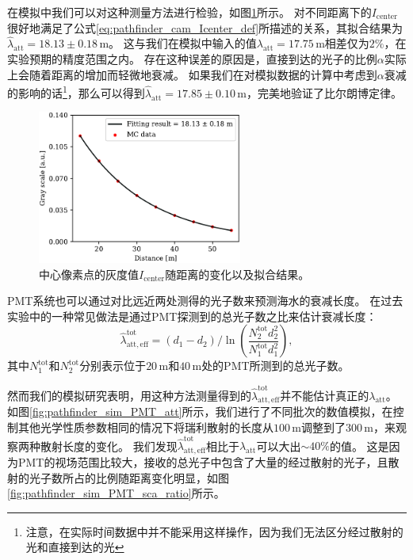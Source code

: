 在模拟中我们可以对这种测量方法进行检验，如图\ref{fig:pathfinder_sim_cam_Icenter_fit}所示。
对不同距离下的$I_{\mathrm{center}}$很好地满足了公式\ref{eq:pathfinder_cam_Icenter_def}所描述的关系，其拟合结果为$\hat{\lambda}_\mathrm{att} = 18.13 \pm 0.18 \,\mathrm{m}$。
这与我们在模拟中输入的值$\lambda_\mathrm{att} = 17.75 \,\mathrm{m}$相差仅为$2\%$，在实验预期的精度范围之内。
存在这种误差的原因是，直接到达的光子的比例$\alpha$实际上会随着距离的增加而轻微地衰减。
如果我们在对模拟数据的计算中考虑到$\alpha$衰减的影响的话\footnote{注意，在实际时间数据中并不能采用这样操作，因为我们无法区分经过散射的光和直接到达的光}，那么可以得到$\hat{\lambda}_\mathrm{att} = 17.85 \pm 0.10 \,\mathrm{m}$，完美地验证了比尔朗博定律。

\begin{figure}[htp]
    \centering
    \includegraphics[width=0.6\textwidth]{img/pathfinder_sim_cam_Icenter_fit.pdf}
    \caption{中心像素点的灰度值$I_{\mathrm{center}}$随距离的变化以及拟合结果。}
    \label{fig:pathfinder_sim_cam_Icenter_fit}
\end{figure}

PMT系统也可以通过对比远近两处测得的光子数来预测海水的衰减长度。
在过去实验\cite{OP_ANTARES:2004, OP_P-One:2021}中的一种常见做法是通过PMT探测到的总光子数之比来估计衰减长度：
\begin{equation}
    \hat{\lambda}_\mathrm{att,eff}^\mathrm{tot} = (d_1 - d_2) / \ln \left( \frac{N_\mathrm{2}^\mathrm{tot} d_2^2}{N_\mathrm{1}^\mathrm{tot} d_1^2} \right) ,
    \label{eq:pathfinder_PMT_att_eff}
\end{equation}
其中$N_1^\mathrm{tot}$和$N_2^\mathrm{tot}$分别表示位于$20\,\mathrm{m}$和$40\,\mathrm{m}$处的PMT所测到的总光子数。

然而我们的模拟研究表明，用这种方法测量得到的$\hat{\lambda} _\mathrm{att,eff} ^\mathrm{tot}$并不能估计真正的$\lambda _\mathrm{att}$。
如图\ref{fig:pathfinder_sim_PMT_att}所示，我们进行了不同批次的数值模拟，在控制其他光学性质参数相同的情况下将瑞利散射的长度从$100\,\mathrm{m}$调整到了$300\,\mathrm{m}$，来观察两种散射长度的变化。
我们发现$\hat{\lambda} _\mathrm{att,eff} ^\mathrm{tot}$相比于$\lambda _\mathrm{att}$可以大出$\sim 40\%$的值。
这是因为PMT的视场范围比较大，接收的总光子中包含了大量的经过散射的光子，且散射的光子数所占的比例随距离变化明显，如图\ref{fig:pathfinder_sim_PMT_sca_ratio}所示。

